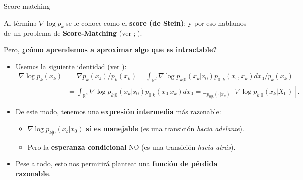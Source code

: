 \documentclass[aspectratio=169,xcolor=dvipsnames, t, spanish]{beamer}
\begin{document}
    \begin{frame}{Score-matching}\vspace{-3mm}
    \begin{center}
        Al término $\nabla \log p_{k}$ se le conoce como el \textbf{score (de Stein)}; y por eso hablamos de un problema de \textbf{Score-Matching} (ver \citet{Hyvarinen2005}; \citet{Vincent2011}).
    
        Pero, \textbf{¿cómo aprendemos a aproximar algo que es intractable?}
    \end{center}
    \pause
        \begin{itemize}
            \item Usemos la siguiente identidad (ver \citet{Efron2011}):
            \begin{align*}
            \nabla \log p_{k}(x_{k}) &= \nabla p_{k}(x_{k})/p_{k}(x_{k})= \int_{\mathbb{R}^{d}}\nabla \log p_{k|0}(x_{k}|x_{0})p_{0,k}(x_{0},x_{k})dx_{0}/p_{k}(x_{k}) \\
            &= \int_{\mathbb{R}^{d}}\nabla \log p_{k|0}(x_{k}|x_{0})p_{0|k}(x_{0}|x_{k})dx_{0} = \mathbb{E}_{p_{0|k}(\cdot|x_{k})}[\nabla \log p_{k|0}(x_{k}|X_{0})].
            \end{align*}
            \pause
            \item De este modo, tenemos una \textbf{expresión intermedia} más razonable:
            \begin{itemize}
                \item $\nabla \log p_{k|0}(x_{k}|x_{0})$ \textbf{sí es manejable} (es una transición \textit{hacia adelante}).
                \item Pero la \textbf{esperanza condicional} NO (es una transición \textit{hacia atrás}).
            \end{itemize}
            \item Pese a todo, esto nos permitirá plantear una \textbf{función de pérdida razonable}.
        \end{itemize}
    \end{frame}
    
\end{document}
